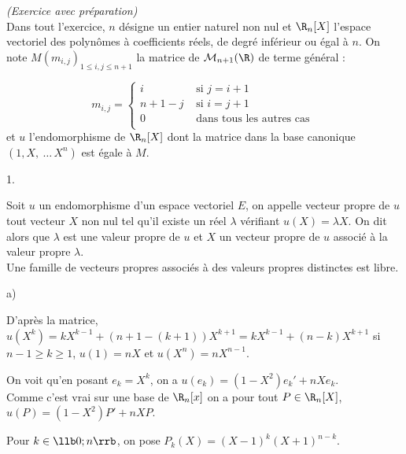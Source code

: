 \documentclass[11pt]{article}%
\begin{document}
 \begin{exercice}{\it (Exercice avec préparation)}~\\
 Dans tout l'exercice, $n$ désigne un entier naturel non nul et
$\R_{n}[X]$ l'espace vectoriel des polynômes à coefficients réels, de
degré inférieur ou égal à $n$. On note $M (m_{i,j})_{1 \leq i,j \leq n
+ 1}$ la matrice de $\mathcal{M}_{n + 1} (\R)$ de terme général : 
 
\[
 m_{i,j} = \left\{ 
\begin{array}{cc}
 i & \text{ si } j = i + 1 \\
n + 1 - j & \text{ si } i = j + 1 \\
0 & \text{ dans tous les autres cas } \\
\end{array}
\right.
\]
 et $u$ l'endomorphisme de $\R_{n}[X]$ dont la matrice dans la base
canonique $(1, X,\ \dots\, X^{n})$ est égale à $M$.
 \begin{noliste}{1.}
 \setlength{\itemsep}{4mm}
 \item Soit $u$ un endomorphisme d'un espace vectoriel $E$, on appelle
vecteur propre de $u$ tout vecteur $X$ non nul tel qu'il existe un réel
$\lambda$ vérifiant $u(X) = \lambda X$. On dit alors que $\lambda$ est
une valeur propre de $u$ et $X$ un vecteur propre de $u$ associé à la
valeur propre $\lambda$. \\
 Une famille de vecteurs propres associés à des valeurs propres
distinctes est libre. \\
 \item 
 \begin{noliste}{a)}
 \setlength{\itemsep}{2mm} 
 \item D'après la matrice, $u(X^{k}) = k X^{k-1} + (n + 1 - (k + 1))
X^{k + 1} = k X^{k-1} + (n-k) X^{k + 1}$ si $n-1 \geq k \geq 1$, $u(1)
= n X$ et $u(X^{n}) = n X^{n-1}$. \\
 \item On voit qu'en posant $e_{k} = X^{k}$, on a $u (e_{k}) = (1 -
X^{2}) e_{k}' + n X e_{k}$. \\
 Comme c'est vrai sur une base de $\R_{n} [x]$ on a pour tout $P \in
\R_{n} [X]$, $u(P) = (1 - X^{2}) P' + n X P$. \\
 \end{noliste}
 \item Pour $k \in \llb 0 ; n \rrb$, on pose $P_{k} (X) = (X-1)^{k} (X
+ 1)^{n-k}$.
 \begin{noliste}{a)}
 \setlength{\itemsep}{2mm} \item $u(P_{k}) = (1-X^{2}) \left[ k

\end{noliste}
\end{noliste}
\end{exercice}
\end{document}
